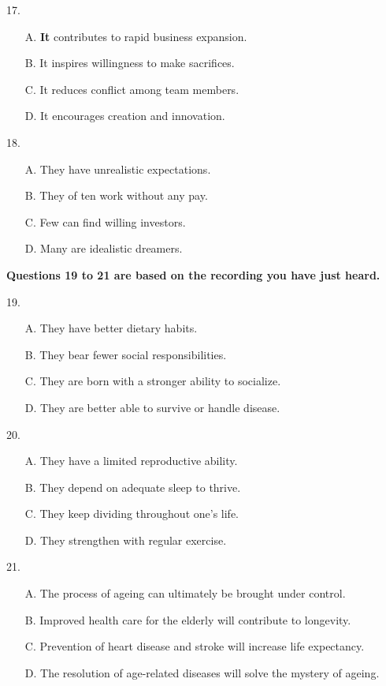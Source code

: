 \documentclass[UTF8,11pt]{ctexart}
\begin{document}
17.


\begin{itemize}[leftmargin=2em,itemsep=.2em,topsep=.4em]\item[A.] \textbf{It }contributes to rapid business expansion.
\item[B.] It inspires willingness to make sacrifices.
\item[C.] It reduces conflict among team members.
\item[D.] It encourages creation and innovation.
\end{itemize}

18.


\begin{itemize}[leftmargin=2em,itemsep=.2em,topsep=.4em]\item[A.] They have unrealistic expectations.
\item[B.] They of ten work without any pay.
\item[C.] Few can find willing investors.
\item[D.] Many are idealistic dreamers.
\end{itemize}

\textbf{Questions 19 to 21 are based on the recording you have just heard.}


19.


\begin{itemize}[leftmargin=2em,itemsep=.2em,topsep=.4em]\item[A.] They have better dietary habits.
\item[B.] They bear fewer social responsibilities.
\item[C.] They are born with a stronger ability to socialize.
\item[D.] They are better able to survive or handle disease.
\end{itemize}

20.


\begin{itemize}[leftmargin=2em,itemsep=.2em,topsep=.4em]\item[A.] They have a limited reproductive ability.
\item[B.] They depend on adequate sleep to thrive.
\item[C.] They keep dividing throughout one's life.
\item[D.] They strengthen with regular exercise.
\end{itemize}

21.


\begin{itemize}[leftmargin=2em,itemsep=.2em,topsep=.4em]\item[A.] The process of ageing can ultimately be brought under control.
\item[B.] Improved health care for the elderly will contribute to longevity.
\item[C.] Prevention of heart disease and stroke will increase life expectancy.
\item[D.] The resolution of age-related diseases will solve the mystery of ageing.
\end{itemize}
\end{document}
